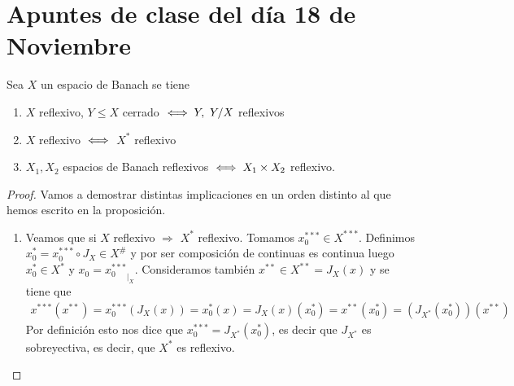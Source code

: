 
\section*{Apuntes de clase del día 18 de Noviembre}

\begin{prop}
    Sea $X$ un espacio de Banach se tiene
    \begin{enumerate}[label=\alph*)]
        \item $X$ reflexivo, $Y\leq X$ cerrado $\iff Y,\ Y/X$ reflexivos 
        \item $X$ reflexivo $\iff$ $X^*$ reflexivo
        \item $X_1, X_2$ espacios de Banach reflexivos $\iff X_1 \times X_2$ reflexivo.
    \end{enumerate}

    \begin{proof} Vamos a demostrar distintas implicaciones en un orden distinto al que hemos escrito en la proposición.
        \begin{enumerate}
            \item Veamos que si $X$ reflexivo $\Rightarrow$ $X^*$ reflexivo. Tomamos $x_0^{***} \in X^{***}$. Definimos $x_0^{*}=x_0^{***}\circ J_X\in X^{\#}$ y por ser composición de continuas es continua luego $x_0^*\in X^*$ y ${x_0=x_{0}^{***}}_{|_{X}}$. Consideramos también $x^{**}\in X^{**}=J_X(x)$ y se tiene que 
            \begin{gather*}
                x^{***}(x^{**}) = x_0^{***}(J_X(x))= x_0^*(x) = J_X(x)(x_0^*)=x^{**}(x_0^*) = (J_{X^*}(x_0^*))(x^{**})
            \end{gather*}
            Por definición esto nos dice que $x_0^{***} = J_{X^*}(x_0^*)$, es decir que $J_{X^*}$ es sobreyectiva, es decir, que $X^*$ es reflexivo.


\end{enumerate}
\end{proof}
\end{prop}
